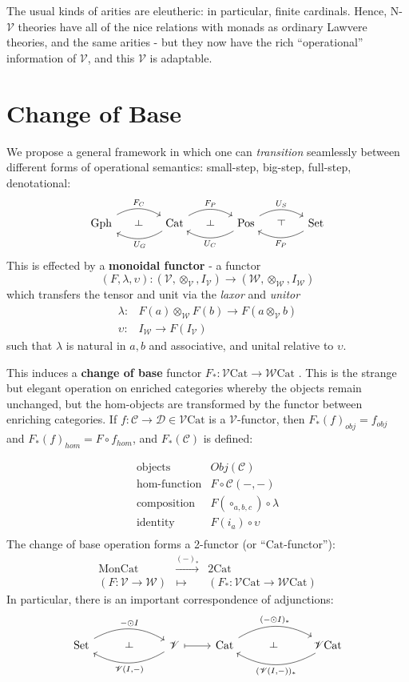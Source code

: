 \documentclass[a4paper,UKenglish]{article}
\theoremstyle{definition}
\def\rd{\rotatebox[origin=c]{90}{$\dashv$}} %
\def\ld{\rotatebox[origin=c]{-90}{$\dashv$}} %
\newcommand{\Gph}{\mathrm{Gph}}
\newcommand{\Set}{\mathrm{Set}}
\newcommand{\Cat}{\mathrm{Cat}}
\newcommand{\Mon}{\mathrm{Mon}}
\newcommand{\Pos}{\mathrm{Pos}}
\newcommand{\NN}{\mathrm{N}}
\newcommand{\V}{\mathscr{V}}
\newcommand{\W}{\mathscr{W}}
\newcommand{\D}{\mathscr{D}}
\newcommand{\C}{\mathscr{C}}
\begin{document}
The usual kinds of arities are eleutheric: in particular, finite cardinals. Hence, $\NN$-$\V$ theories have all of the nice relations with monads as ordinary Lawvere theories, and the same arities - but they now have the rich ``operational'' information of $\V$, and this $\V$ is adaptable.

\section{Change of Base}

We propose a general framework in which one can \textit{transition} seamlessly between different forms of operational semantics: small-step, big-step, full-step, denotational:
\[\begin{tikzcd}[column sep=small]
\Gph \arrow[bend left,below]{rr}{F_C}
& \ld &
\arrow[bend left,above]{ll}{U_G} \Cat \arrow[bend left,below]{rr}{F_P}
& \ld &
\arrow[bend left,above]{ll}{U_C} \Pos \arrow[bend left,below]{rr}{U_S}
& \rd &
\Set \arrow[bend left,above]{ll}{F_P}
\end{tikzcd}\]
This is effected by a \textbf{monoidal functor} - a functor $$(F,\lambda,\upsilon): (\V,\otimes_\V,I_\V) \to (\W,\otimes_\W,I_\W)$$ which transfers the tensor and unit via the \textit{laxor} and \textit{unitor}
\[\begin{array}{rl}
\lambda: & F(a) \otimes_\W F(b) \to F(a\otimes_\V b)\\
\upsilon: & I_\W \to F(I_\V)
\end{array}\]
such that $\lambda$ is natural in $a,b$ and associative, and unital relative to $\upsilon$.

This induces a \textbf{change of base} functor $F_*:\V\Cat \to \W\Cat$ \cite{borceux}. This is the strange but elegant operation on enriched categories whereby the objects remain unchanged, but the hom-objects are transformed by the functor between enriching categories. If $f: \C \to \D \in \V\Cat$ is a $\V$-functor, then $F_*(f)_{obj} = f_{obj}$ and $F_*(f)_{hom} = F\circ f_{hom}$, and $F_*(\C)$ is defined:

\[\begin{array}{rl}
\text{objects} & Obj(\C)\\
\text{hom-function} & F \circ \C(-,-)\\
\text{composition} & F(\circ_{a,b,c}) \circ \lambda\\
\text{identity} & F(i_a) \circ \upsilon\\
\end{array}\]
The change of base operation forms a 2-functor (or ``$\Cat$-functor''):
\[\begin{array}{ccc}
\Mon\Cat & \xrightarrow{(-)_*} & 2\Cat\\
(F: \V\to\W) & \mapsto & (F_*: \V\Cat\to\W\Cat)
\end{array}\]
In particular, there is an important correspondence of adjunctions:
\[\begin{tikzcd}
	\Set \arrow[bend left,below]{rr}{-\odot I}
	& \ld &
	\arrow[bend left,above]{ll}{\V(I,-)} \V
	\arrow[maps to]{r}
	& \Cat \arrow[bend left,below]{rr}{(-\odot I)_*}
	& \ld &
	\arrow[bend left,above]{ll}{(\V(I,-))_*} \V\Cat
\end{tikzcd}\]
\end{document}
